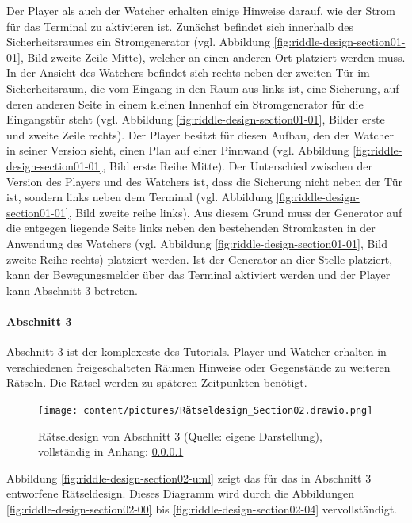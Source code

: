 Der Player als auch der Watcher erhalten einige Hinweise darauf, wie der Strom für das Terminal zu aktivieren ist. Zunächst befindet sich innerhalb des Sicherheitsraumes ein Stromgenerator (vgl. Abbildung \ref{fig:riddle-design-section01-01}, Bild zweite Zeile Mitte), welcher an einen anderen Ort platziert werden muss. In der Ansicht des Watchers befindet sich rechts neben der zweiten Tür im Sicherheitsraum, die vom Eingang in den Raum aus links ist, eine Sicherung, auf deren anderen Seite in einem kleinen Innenhof ein Stromgenerator für die Eingangstür steht (vgl. Abbildung \ref{fig:riddle-design-section01-01}, Bilder erste und zweite Zeile rechts). Der Player besitzt für diesen Aufbau, den der Watcher in seiner Version sieht, einen Plan auf einer Pinnwand (vgl. Abbildung \ref{fig:riddle-design-section01-01}, Bild erste Reihe Mitte). Der Unterschied zwischen der Version des Players und des Watchers ist, dass die Sicherung nicht neben der Tür ist, sondern links neben dem Terminal (vgl. Abbildung \ref{fig:riddle-design-section01-01}, Bild zweite reihe links). Aus diesem Grund muss der Generator auf die entgegen liegende Seite links neben den bestehenden Stromkasten in der Anwendung des Watchers (vgl. Abbildung \ref{fig:riddle-design-section01-01}, Bild zweite Reihe rechts) platziert werden. Ist der Generator an dier Stelle platziert, kann der Bewegungsmelder über das Terminal aktiviert werden und der Player kann Abschnitt 3 betreten.

\paragraph{Abschnitt 3}
Abschnitt 3 ist der komplexeste des Tutorials. Player und Watcher erhalten in verschiedenen freigeschalteten Räumen Hinweise oder Gegenstände zu weiteren Rätseln. Die Rätsel werden zu späteren Zeitpunkten benötigt.

\begin{figure}[ht]
\centering
\texttt{[image: content/pictures/Rätseldesign\_Section02.drawio.png]}
\caption{Rätseldesign von Abschnitt 3 (Quelle: eigene Darstellung), vollständig in Anhang: \ref{}}
\label{fig:r
iddle-design-section02-uml}
\end{figure}

Abbildung \ref{fig:riddle-design-section02-uml} zeigt das für das in Abschnitt 3 entworfene Rätseldesign. Dieses Diagramm wird durch die Abbildungen \ref{fig:riddle-design-section02-00} bis \ref{fig:riddle-design-section02-04} vervollständigt.

